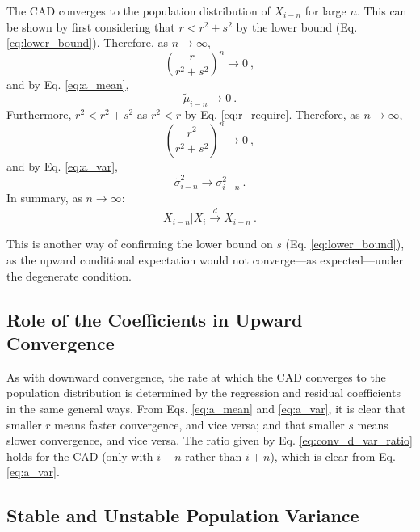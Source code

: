 \documentclass{svproc} %
\begin{document}
The CAD converges to the population distribution of $X_{i-n}$ for large $n$. This can be shown by first considering that $r < r^2 + s^2$ by the lower bound (Eq. \ref{eq:lower_bound}). Therefore, as $n \rightarrow \infty$,
\begin{equation}
(\frac{r}{r^2+s^2})^n \rightarrow 0 \ ,
\label{eq:conv_up_one}
\end{equation}
and by Eq. \ref{eq:a_mean}, 
\begin{equation}
\tilde{\mu}_{i-n} \rightarrow 0 \ .
\label{eq:conv_a_mean}
\end{equation}
%
Furthermore, $r^2 < r^2 + s^2$ as $r^2 < r$ by Eq. \ref{eq:r_require}. Therefore, as $n \rightarrow \infty$,
\begin{equation}
(\frac{r^2}{r^2+s^2})^n \rightarrow 0 \ ,
\label{eq:conv_up_two}
\end{equation}
and by Eq. \ref{eq:a_var}, 
\begin{equation}
\tilde{\sigma}_{i-n}^2 \rightarrow \sigma_{i-n}^2 \ .
\label{eq:conv_a_var}
\end{equation}
%
In summary, as $n \rightarrow \infty$:
\begin{equation}
X_{i-n}|X_i \xrightarrow{\overset{}{d}} X_{i-n} \ .
\label{eq:conv_a}
\end{equation}

This is another way of confirming the lower bound on $s$ (Eq. \ref{eq:lower_bound}), as the upward conditional expectation would not converge---as expected---under the degenerate condition.


\subsection{Role of the Coefficients in Upward Convergence} \label{role_up}
As with downward convergence, the rate at which the CAD converges to the population distribution is determined by the regression and residual coefficients in the same general ways. From Eqs. \ref{eq:a_mean} and \ref{eq:a_var}, it is clear that smaller $r$ means faster convergence, and vice versa; and that smaller $s$ means slower convergence, and vice versa. The ratio given by Eq. \ref{eq:conv_d_var_ratio} holds for the CAD (only with $i-n$ rather than $i+n$), which is clear from Eq. \ref{eq:a_var}. 


\subsection{Stable and Unstable Population Variance} \label{pvd}
\end{document}

